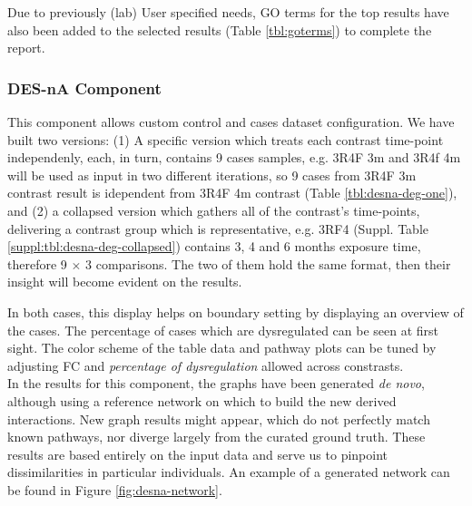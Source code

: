 Due to previously (lab) User specified needs, GO terms for the top results have also been added to the selected results (Table \ref{tbl:goterms}) to complete the report.

\subsubsection{DES-nA Component}
This component allows custom control and cases dataset configuration. We have built two versions: (1) A specific version which treats each contrast time-point independenly, each, in turn, contains 9 cases samples, e.g. 3R4F 3m and 3R4f 4m will be used as input in two different iterations, so 9 cases from 3R4F 3m contrast result is idependent from 3R4F 4m contrast (Table \ref{tbl:desna-deg-one}), and (2) a collapsed version which gathers all of the contrast's time-points, delivering a contrast group which is representative, e.g. 3RF4 (Suppl. Table \ref{suppl:tbl:desna-deg-collapsed}) contains 3, 4 and 6 months exposure time, therefore 9 $\times$ 3 comparisons. The two of them hold the same format, then their insight will become evident on the results.



In both cases, this display helps on boundary setting by displaying an overview of the cases. The percentage of cases which are dysregulated can be seen at first sight. The color scheme of the table data and pathway plots can be tuned by adjusting FC and \textit{percentage of dysregulation} allowed across constrasts.
\\

In the results for this component, the graphs have been generated \textit{de novo}, although using a reference network on which to build the new derived interactions. New graph results might appear, which do not perfectly match known pathways, nor diverge largely from the curated ground truth. These results are based entirely on the input data and serve us to pinpoint dissimilarities in particular individuals. An example of a generated network can be found in Figure \ref{fig:desna-network}.
\\

